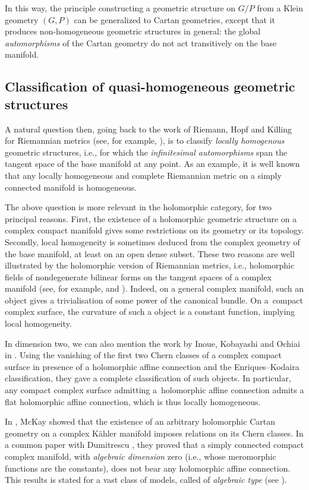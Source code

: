 \documentclass[pdftex]{sigma}
\numberwithin{equation}{section}
\begin{document}
 In this way, the principle constructing a geometric structure on $G/P$ from a Klein geometry $(G,P)$ can be generalized to Cartan geometries, except that it produces non-homogeneous geometric structures in general: the global \textit{automorphisms} of the Cartan geometry do not act transitively on the base manifold.

 \subsection{Classification of quasi-homogeneous geometric structures}
 A natural question then, going back to the work of Riemann, Hopf and Killing for Riemannian metrics (see, for example, \cite{Wolf}), is to classify \textit{locally homogenous} geometric structures, i.e., for which the \textit{infinitesimal automorphisms} span the tangent space of the base manifold at any point. As an example, it is well known that any locally homogeneous and complete Riemannian metric on a simply connected manifold is homogeneous.

 The above question is more relevant in the holomorphic category, for two principal reasons. First, the existence of a holomorphic geometric structure on a complex compact manifold gives some restrictions on its geometry or its topology. Secondly, local homogeneity is sometimes deduced from the complex geometry of the base manifold, at least on an open dense subset. These two reasons are well illustrated by the holomorphic version of Riemannian metrics, i.e., holomorphic fields of nondegenerate bilinear forms on the tangent spaces of a complex manifold (see, for example, \cite[definition on p.~1663]{DumitrescuMetriques} and \cite[definition on p.~210]{LeBrun}). Indeed, on a general complex manifold, such an object gives a trivialisation of some power of the canonical bundle. On a~compact complex surface, the curvature of such a object is a constant function, implying local homogeneity.

 In dimension two, we can also mention the work by Inoue, Kobayashi and Ochiai in \cite{InoueKobayashi}. Using the vanishing of the first two Chern classes of a complex compact surface in presence of a holomorphic affine connection and the Enriques--Kodaira classification, they gave a complete classification of such objects. In particular, any compact complex surface admitting a~holomorphic affine connection admits a flat holomorphic affine connection, which is thus locally homogeneous.

In \cite{McKay}, McKay showed that the existence of an arbitrary holomorphic Cartan geometry on a complex K\"ahler manifold imposes relations on its Chern classes. In a common paper with Dumitrescu \cite{BD}, they proved that a simply connected compact complex manifold, with \textit{algebraic dimension} zero (i.e., whose meromorphic functions are the constants), does not bear any holomorphic affine connection. This results is stated for a vast class of models, called of \textit{algebraic type} (see \cite[p.~1]{Dumitrescu1}).
\end{document}
